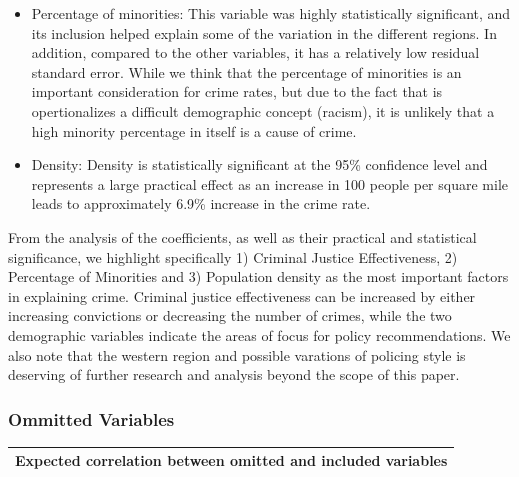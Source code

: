 \documentclass[]{article}
\begin{document}
\begin{itemize}
\item
  Percentage of minorities: This variable was highly statistically
  significant, and its inclusion helped explain some of the variation in
  the different regions. In addition, compared to the other variables,
  it has a relatively low residual standard error. While we think that
  the percentage of minorities is an important consideration for crime
  rates, but due to the fact that is opertionalizes a difficult
  demographic concept (racism), it is unlikely that a high minority
  percentage in itself is a cause of crime.\\
\item
  Density: Density is statistically significant at the 95\% confidence
  level and represents a large practical effect as an increase in 100
  people per square mile leads to approximately 6.9\% increase in the
  crime rate.
\end{itemize}

From the analysis of the coefficients, as well as their practical and
statistical significance, we highlight specifically 1) Criminal Justice
Effectiveness, 2) Percentage of Minorities and 3) Population density as
the most important factors in explaining crime. Criminal justice
effectiveness can be increased by either increasing convictions or
decreasing the number of crimes, while the two demographic variables
indicate the areas of focus for policy recommendations. We also note
that the western region and possible varations of policing style is
deserving of further research and analysis beyond the scope of this
paper.

\hypertarget{ommitted-variables}{%
\subsubsection{Ommitted Variables}\label{ommitted-variables}}

\begin{longtable}[]{@{}l@{}}
\toprule
Expected correlation between omitted and included
variables\tabularnewline
\midrule
\endhead
\bottomrule
\end{longtable}
\end{document}
